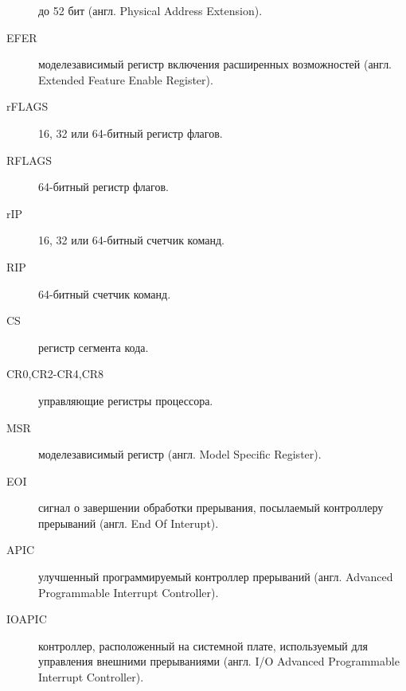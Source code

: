 \begin{description}
до 52 бит (англ. Physical Address Extension).
\item[EFER] моделезависимый регистр включения расширенных возможностей (англ. Extended Feature Enable Register).
\item[rFLAGS] 16, 32 или 64-битный регистр флагов.
\item[RFLAGS] 64-битный регистр флагов.
\item[rIP] 16, 32 или 64-битный счетчик команд.
\item[RIP] 64-битный счетчик команд.
\item[CS] регистр сегмента кода.
\item[CR0,CR2-CR4,CR8] управляющие регистры процессора.
\item[MSR] моделезависимый регистр (англ. Model Specific Register).
\item[EOI] сигнал о завершении обработки прерывания, посылаемый
	контроллеру прерываний (англ. End Of Interupt).
\item[APIC] улучшенный программируемый контроллер прерываний (англ. Advanced Programmable Interrupt Controller).
\item[IOAPIC] контроллер, расположенный на системной плате,
	используемый для управления внешними прерываниями (англ. I/O Advanced Programmable Interrupt Controller).
\end{description}
